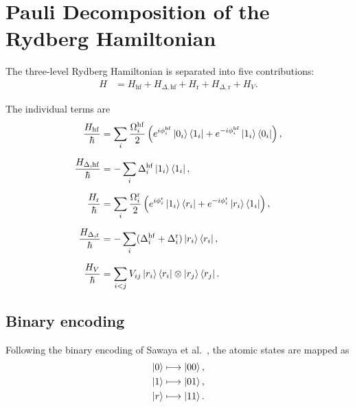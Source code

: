 \documentclass[amssymb,twocolumn,aps]{revtex4-2}
\begin{document}
\appendix
\section{Pauli Decomposition of the Rydberg Hamiltonian}
\label{app:pauli_decomposition}

The three-level Rydberg Hamiltonian is separated into
five contributions:
\begin{align*}
    H &= H_{\mathrm{hf}}
       + H_{\Delta,\mathrm{hf}}
       + H_{\mathrm{r}}
       + H_{\Delta,\mathrm{r}}
       + H_V.
\end{align*}

The individual terms are
\begin{align*}
    \frac{H_{\mathrm{hf}}}{\hbar}
    &= \sum_i \frac{\Omega_i^{\mathrm{hf}}}{2}
    \left(
        e^{i\phi_i^{\mathrm{hf}}}\ket{0_i}\bra{1_i}
        + e^{-i\phi_i^{\mathrm{hf}}}\ket{1_i}\bra{0_i}
    \right), \\[6pt]
    \frac{H_{\Delta,\mathrm{hf}}}{\hbar}
    &= -\sum_i \Delta_i^{\mathrm{hf}}
       \ket{1_i}\bra{1_i}, \\[6pt]
    \frac{H_{\mathrm{r}}}{\hbar}
    &= \sum_i \frac{\Omega_i^{\mathrm{r}}}{2}
    \left(
        e^{i\phi_i^{\mathrm{r}}}\ket{1_i}\bra{r_i}
        + e^{-i\phi_i^{\mathrm{r}}}\ket{r_i}\bra{1_i}
    \right), \\[6pt]
    \frac{H_{\Delta,\mathrm{r}}}{\hbar}
    &= -\sum_i
       (\Delta_i^{\mathrm{hf}}+\Delta_i^{\mathrm{r}})
       \ket{r_i}\bra{r_i}, \\[6pt]
    \frac{H_V}{\hbar}
    &= \sum_{i<j} V_{ij}
       \ket{r_i}\bra{r_i}
       \otimes \ket{r_j}\bra{r_j}.
\end{align*}

\subsection*{Binary encoding}

Following the binary encoding of Sawaya et
al.~\cite{Sawaya2020}, the atomic states are mapped as
\begin{align*}
    \ket{0} &\longmapsto \ket{00},\\
    \ket{1} &\longmapsto \ket{01},\\
    \ket{r} &\longmapsto \ket{11}.
\end{align*}
\end{document}
